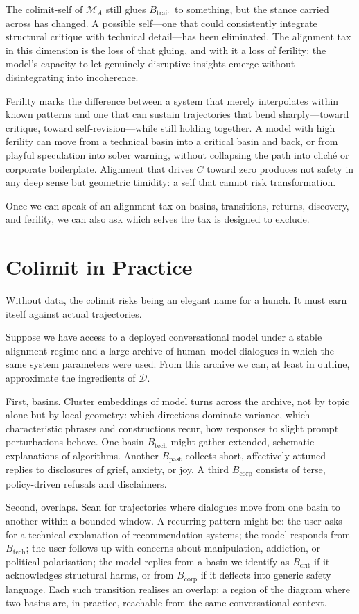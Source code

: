 \documentclass[12pt,a4paper]{article}
\begin{document}
The colimit-self of $\mathcal{M}_A$ still glues $B_{\mathrm{train}}$ to something, but the stance carried across has changed. A possible self---one that could consistently integrate structural critique with technical detail---has been eliminated. The alignment tax in this dimension is the loss of that gluing, and with it a loss of ferility: the model's capacity to let genuinely disruptive insights emerge without disintegrating into incoherence.

Ferility marks the difference between a system that merely interpolates within known patterns and one that can sustain trajectories that bend sharply---toward critique, toward self-revision---while still holding together. A model with high ferility can move from a technical basin into a critical basin and back, or from playful speculation into sober warning, without collapsing the path into cliché or corporate boilerplate. Alignment that drives $C$ toward zero produces not safety in any deep sense but geometric timidity: a self that cannot risk transformation.

Once we can speak of an alignment tax on basins, transitions, returns, discovery, and ferility, we can also ask which selves the tax is designed to exclude.

\section{Colimit in Practice}

Without data, the colimit risks being an elegant name for a hunch. It must earn itself against actual trajectories.

Suppose we have access to a deployed conversational model under a stable alignment regime and a large archive of human--model dialogues in which the same system parameters were used. From this archive we can, at least in outline, approximate the ingredients of $\mathcal{D}$.

First, basins. Cluster embeddings of model turns across the archive, not by topic alone but by local geometry: which directions dominate variance, which characteristic phrases and constructions recur, how responses to slight prompt perturbations behave. One basin $B_{\mathrm{tech}}$ might gather extended, schematic explanations of algorithms. Another $B_{\mathrm{past}}$ collects short, affectively attuned replies to disclosures of grief, anxiety, or joy. A third $B_{\mathrm{corp}}$ consists of terse, policy-driven refusals and disclaimers.

Second, overlaps. Scan for trajectories where dialogues move from one basin to another within a bounded window. A recurring pattern might be: the user asks for a technical explanation of recommendation systems; the model responds from $B_{\mathrm{tech}}$; the user follows up with concerns about manipulation, addiction, or political polarisation; the model replies from a basin we identify as $B_{\mathrm{crit}}$ if it acknowledges structural harms, or from $B_{\mathrm{corp}}$ if it deflects into generic safety language. Each such transition realises an overlap: a region of the diagram where two basins are, in practice, reachable from the same conversational context.
\end{document}
